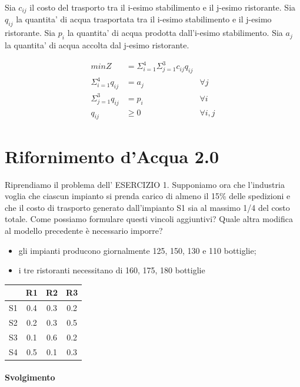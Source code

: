 Sia $c_{ij}$ il costo del trasporto tra il i-esimo stabilimento e il j-esimo ristorante.
Sia $q_{ij}$ la quantita' di acqua trasportata tra il i-esimo stabilimento e il j-esimo ristorante.
Sia $p_i$ la quantita' di acqua prodotta dall'i-esimo stabilimento.
Sia $a_j$ la quantita' di acqua accolta dal j-esimo ristorante.

\begin{align*}
    min Z &= \Sigma ^{4} _{i=1} \Sigma ^{3} _{j=1} c_{ij} q_{ij} \\
    \Sigma ^{4} _{i=1} q_{ij} &= a_j &\forall j\\
    \Sigma ^{3} _{j=1} q_{ij} &= p_i &\forall i\\
    q_{ij} &\geq 0 &\forall i,j 
\end{align*}

\section{Rifornimento d'Acqua 2.0}

Riprendiamo il problema dell’ ESERCIZIO 1. Supponiamo ora che l’industria voglia che ciascun impianto si prenda carico di almeno il 15\% delle spedizioni e che il costo di trasporto generato dall’impianto S1 sia al massimo 1/4 del costo totale. Come possiamo formulare questi vincoli aggiuntivi? Quale altra modifica al modello precedente è necessario imporre?

\begin{itemize}
    \item gli impianti producono giornalmente 125, 150, 130 e 110 bottiglie;
    \item i tre ristoranti necessitano di 160, 175, 180 bottiglie
\end{itemize}

\begin{center}
    \begin{tabular}{||c | c | c | c||}
        \hline
        & R1 & R2 & R3 \\
        \hline
        S1 & 0.4 & 0.3 & 0.2 \\
        \hline
        S2 & 0.2 & 0.3 & 0.5 \\
        \hline
        S3 & 0.1 & 0.6 & 0.2 \\
        \hline
        S4 & 0.5 & 0.1 & 0.3 \\
        \hline
    \end{tabular}
\end{center}

\paragraph{Svolgimento}

